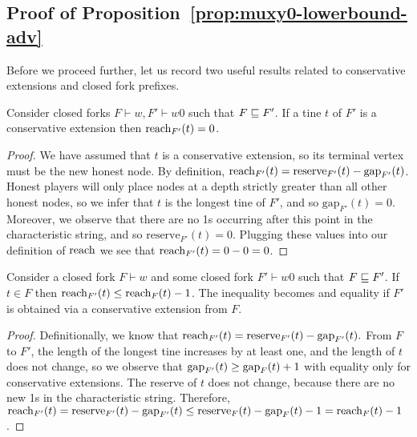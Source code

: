 \subsection{Proof of Proposition~\ref{prop:muxy0-lowerbound-adv}}
  Before we proceed further, let us record two useful results related to conservative extensions 
  and closed fork prefixes. 

  \begin{claim}\label{claim:ex}
    Consider closed forks $F\vdash w, F'\vdash w0$ 
    such that $F\sqsubseteq F'$. 
    If a tine $t$ of $F'$ is a conservative extension 
    then $\operatorname{reach}_{F'}(t)=0$.
  \end{claim}
  \begin{proof}
    We have assumed that $t$ is a conservative extension, 
    so its terminal vertex must be the new honest node. 
    By definition, 
    $\operatorname{reach}_{F'}(t)=\text{reserve}_{F'}(t)-\text{gap}_{F'}(t)$. 
    Honest players will only place nodes 
    at a depth strictly greater than all other honest nodes, 
    so we infer that $t$ is the longest tine of $F'$, 
    and so $\text{gap}_{F'}(t)=0$. 
    Moreover, we observe that 
    there are no 1s occurring after this point 
    in the characteristic string, 
    and so $\text{reserve}_{F'}(t)=0$. 
    Plugging these values into 
    our definition of $\operatorname{reach}$ 
    we see that $\operatorname{reach}_{F'}(t)=0-0=0$. 
  \end{proof}


  \begin{claim}\label{claim:nex}
    Consider a closed fork $F\vdash w$ and some closed fork $F'\vdash w0$ such that $F\sqsubseteq F'$. If $t \in F$ then 
    $\operatorname{reach}_{F'}(t)\leq \operatorname{reach}_{F}(t) - 1$. 
    The inequality becomes and equality 
    if $F'$ is obtained via a conservative extension from $F$.
  \end{claim}
  \begin{proof}
    Definitionally, we know that $\operatorname{reach}_{F'}(t)=\text{reserve}_{F'}(t)-\text{gap}_{F'}(t).$ From $F$ to $F'$, the length of the longest tine increases by at least one, and the length of $t$ does not change, so we observe that $\operatorname{gap}_{F'}(t) \geq \operatorname{gap}_{F}(t) + 1$ 
    with equality only for conservative extensions. 
    The reserve of $t$ does not change, because there are no new 1s in the characteristic string. Therefore, 
    $
      \operatorname{reach}_{F'}(t)
      =\text{reserve}_{F'}(t)-\text{gap}_{F'}(t)
      \leq \text{reserve}_{F}(t)-\text{gap}_{F}(t) - 1
      =\operatorname{reach}_{F}(t) - 1
    $. 
  \end{proof}

